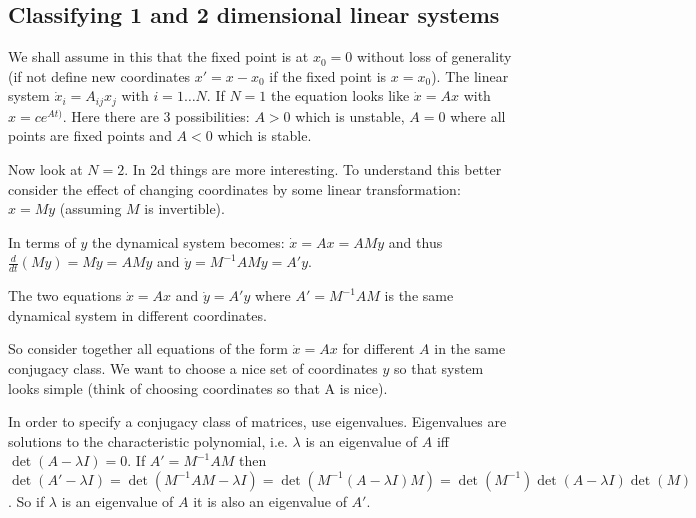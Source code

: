 \subsection{Classifying 1 and 2 dimensional linear systems}

We shall assume in this that the fixed point is at $x_0 = 0$ without loss of generality (if not define new coordinates $x' = x - x_0$ if the fixed point is $x = x_0$). The linear system $\dot{x}_i = A_{ij} x_j$ with $i = 1 \ldots N$. If $N=1$ the equation looks like $\dot{x} = Ax$ with $x = c e^{At)}$. Here there are 3 possibilities: $A>0$ which is unstable, $A=0$ where all points are fixed points and $A<0$ which is stable.

Now look at $N=2$. In 2d things are more interesting. To understand this better consider the effect of changing coordinates by some linear transformation: $x = M y$ (assuming $M$ is invertible).

In terms of $y$ the dynamical system becomes: $\dot{x} = Ax = AMy$ and thus $\frac{d}{dt} (My) = M\dot{y} = AMy$ and $\dot{y} = M^{-1}AM y= A' y$.

The two equations $\dot{x} = Ax$ and $\dot{y} = A' y$ where $A' = M^{-1}AM$ is the same dynamical system in different coordinates.

So consider together all equations of the form $\dot{x} = A x$ for different $A$ in the same conjugacy class. We want to choose a nice set of coordinates $y$ so that system looks simple (think of choosing coordinates so that A is nice).

In order to specify a conjugacy class of matrices, use eigenvalues. Eigenvalues are solutions to the characteristic polynomial, i.e. $\lambda$ is an eigenvalue of $A$ iff $\det (A - \lambda I) = 0$. If $A' = M^{-1}AM$ then $\det (A' - \lambda I) = \det (M^{-1}AM - \lambda I) = \det(M^{-1} (A - \lambda I) M) = \det(M^{-1}) \det(A - \lambda I) \det (M)$. So if $\lambda$ is an eigenvalue of $A$ it is also an eigenvalue of $A'$.